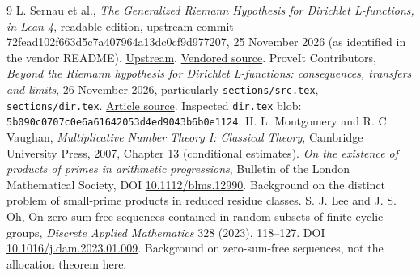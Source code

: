 \documentclass[11pt]{article}
\theoremstyle{remark}\newtheorem{remark}[theorem]{Remark}
\begin{document}
\begin{thebibliography}{9}
 L. Sernau et al., \emph{The Generalized Riemann Hypothesis for Dirichlet L-functions, in Lean 4}, readable edition, upstream commit 72fead102f663d5c7a407964a13dc0cf9d977207, 25 November 2026 (as identified in the vendor README). \href{https://github.com/lsernau/grh-lean/tree/72fead102f663d5c7a407964a13dc0cf9d977207/grh}{Upstream}. \href{https://github.com/VladimirReshetnikov/ProveIt/tree/main/Analysis/GeneralizedRiemannHypothesis/vendor/grh-lean}{Vendored source}.
 ProveIt Contributors, \emph{Beyond the Riemann hypothesis for Dirichlet L-functions: consequences, transfers and limits}, 26 November 2026, particularly \texttt{sections/src.tex}, \texttt{sections/dir.tex}. \href{https://github.com/VladimirReshetnikov/ProveIt/tree/main/Analysis/GeneralizedRiemannHypothesis/Article}{Article source}. Inspected \texttt{dir.tex} blob: \texttt{5b090c0707c0e6a61642053d4ed9043b6b0e1124}.
 H. L. Montgomery and R. C. Vaughan, \emph{Multiplicative Number Theory I: Classical Theory}, Cambridge University Press, 2007, Chapter 13 (conditional estimates).
 \emph{On the existence of products of primes in arithmetic progressions}, Bulletin of the London Mathematical Society, DOI \href{https://doi.org/10.1112/blms.12990}{10.1112/blms.12990}. Background on the distinct problem of small-prime products in reduced residue classes.
 S. J. Lee and J. S. Oh, On zero-sum free sequences contained in random subsets of finite cyclic groups, \emph{Discrete Applied Mathematics} 328 (2023), 118--127. DOI \href{https://doi.org/10.1016/j.dam.2023.01.009}{10.1016/j.dam.2023.01.009}. Background on zero-sum-free sequences, not the allocation theorem here.
\end{thebibliography}
\end{document}
